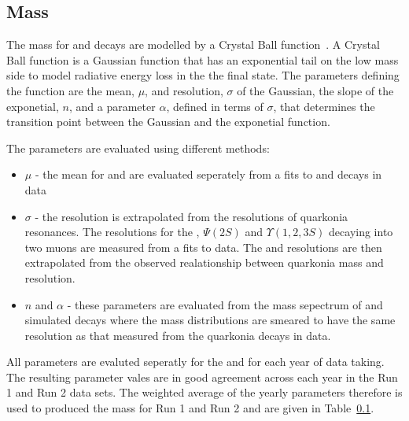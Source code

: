 \subsection{Mass \pdfs}
The mass \pdfs for \bdmumu and \bsmumu decays are modelled by a Crystal Ball function~\cite{}. A Crystal Ball function is a Gaussian function that has an exponential tail on the low mass side to model radiative energy loss in the the final state. The parameters defining the function are the mean, $\mu$, and resolution, $\sigma$ of the Gaussian, the slope of the exponetial, $n$, and a parameter $\alpha$, defined in terms of $\sigma$, that determines the transition point between the Gaussian and the exponetial function. 

The parameters are evaluated using different methods:
\begin{itemize}
\item $\mu$ - the mean for \bd and \bs are evaluated seperately from a fits to \bdkpi and \bskk decays in data
\item $\sigma$ - the resolution is extrapolated from the resolutions of quarkonia resonances. The resolutions for the \jpsi, $\Psi (2S)$ and $\Upsilon(1, 2, 3S)$ decaying into two muons are measured from a fits to data. The \bd and \bs resolutions are then extrapolated from the observed realationship between quarkonia mass and resolution.
\item $n$ and $\alpha$ - these parameters are evaluated from the mass sepectrum of \bdmumu and \bsmumu simulated decays where the mass distributions are smeared to have the same resolution as that measured from the quarkonia decays in data.
\end{itemize}

All parameters are evaluted seperatly for the \bd and \bs for each year of data taking. The resulting parameter vales are in good agreement across each year in the Run 1 and Run 2 data sets. The weighted average of the yearly parameters therefore is used to produced the mass \pdfs for Run 1 and Run 2 and are given in Table~\ref{}.



